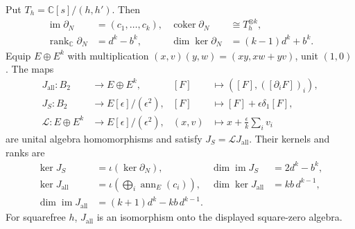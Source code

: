 \begin{theorem}
Put \(T_h=\mathbb C[s]/(h,h')\).  Then
\[
 \begin{aligned}
 \operatorname{im}\partial_N&=(c_1,\ldots,c_k),&
 \operatorname{coker}\partial_N&\cong T_h^{\otimes k},\\
 \operatorname{rank}_{\mathbb C}\partial_N&=d^k-b^k,&
 \dim\ker\partial_N&=(k-1)d^k+b^k.
 \end{aligned}\tag{CC.31}
\]
Equip \(E\oplus E^k\) with multiplication
\((x,v)(y,w)=(xy,xw+yv)\), unit \((1,0)\).
The maps
\[
 \begin{aligned}
 J_{\mathrm{all}}:B_2&\longrightarrow E\oplus E^k,&
 [F]&\longmapsto([F],([\partial_iF])_i),\\
 J_S:B_2&\longrightarrow E[\epsilon]/(\epsilon^2),&
 [F]&\longmapsto[F]+\epsilon\delta_1[F],\\
 \mathcal L:E\oplus E^k&\longrightarrow E[\epsilon]/(\epsilon^2),&
 (x,v)&\longmapsto x+\frac{\epsilon}{k}\sum_i v_i
 \end{aligned}\tag{CC.32}
\]
are unital algebra homomorphisms and satisfy
\(J_S=\mathcal L J_{\mathrm{all}}\).  Their kernels and ranks are
\[
 \begin{aligned}
 \ker J_S&=\iota(\ker\partial_N),&
 \dim\operatorname{im}J_S&=2d^k-b^k,\\
 \ker J_{\mathrm{all}}&=
    \iota\left(\bigoplus_i\operatorname{ann}_E(c_i)\right),&
 \dim\ker J_{\mathrm{all}}&=kb\,d^{k-1},\\
 \dim\operatorname{im}J_{\mathrm{all}}
    &=(k+1)d^k-kb\,d^{k-1}.&&
 \end{aligned}\tag{CC.33}
\]
For squarefree \(h\), \(J_{\mathrm{all}}\) is an isomorphism onto
the displayed square-zero algebra.
\end{theorem}
